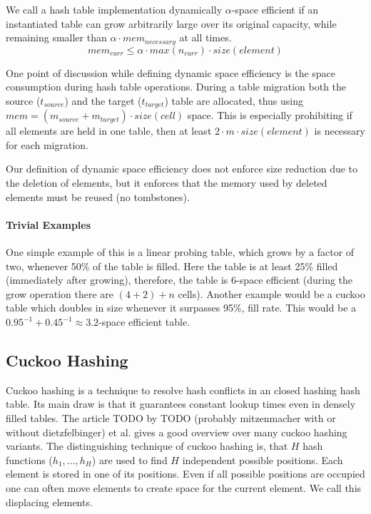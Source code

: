 \documentclass[a4paper,UKenglish]{lipics-v2016}
\begin{document}
We call a hash table implementation dynamically $\alpha$-space
efficient if an instantiated table can grow arbitrarily large over its
original capacity, while remaining smaller than $\alpha\cdot
mem_{necessary}$ at all times.
\[mem_{curr} \leq \alpha\cdot max(n_{curr})\cdot size(element)\]

One point of discussion while defining dynamic space efficiency is the
space consumption during hash table operations.  During a table
migration both the source ($t_{source}$) and the target
($t_{target}$) table are allocated, thus using $mem =
(m_{source}+m_{target})\cdot size(cell)$ space.  This is especially
prohibiting if all elements are held in one table, then at least
$2\cdot m\cdot size(element)$ is necessary for each migration.

Our definition of dynamic space efficiency does not enforce size
reduction due to the deletion of elements, but it enforces that the
memory used by deleted elements must be reused (no tombstones).

\paragraph*{Trivial Examples}
One simple example of this is a linear probing table, which grows by a
factor of two, whenever 50\% of the table is filled. Here the table is
at least 25\% filled (immediately after growing), therefore, the table
is 6-space efficient (during the grow operation there are $(4+2)+n$
cells). Another example would be a cuckoo table which doubles in size
whenever it surpasses 95\%, fill rate. This would be a
$0.95^{-1}+0.45^{-1}\approx 3.2$-space efficient table.

\subsection{Cuckoo Hashing}
Cuckoo hashing is a technique to resolve hash conflicts in an closed
hashing hash table. Its main draw is that it guarantees constant
lookup times even in densely filled tables. The article TODO by TODO
(probably mitzenmacher with or without dietzfelbinger) et al. gives a
good overview over many cuckoo hashing variants.  The distinguishing
technique of cuckoo hashing is, that $H$ hash functions ($h_1, ... ,
h_H$) are used to find $H$ independent possible positions. Each
element is stored in one of its positions.  Even if all possible
positions are occupied one can often move elements to create space for
the current element. We call this displacing elements.
\end{document}
